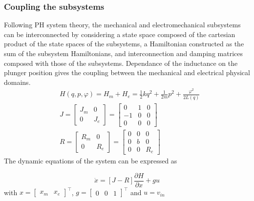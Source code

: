 \documentclass[letterpaper, 10pt, conference]{ieeeconf}
\begin{document}
\subsubsection{Coupling the subsystems}
Following PH system theory, the mechanical and electromechanical subsystems can be interconnected by considering a state space composed of the cartesian product of the state spaces of the subsystems, a Hamiltonian constructed as the sum of the subsystem Hamiltonians, and interconnection and damping matrices composed with those of the subsystems. Dependance of the inductance on the plunger position gives the coupling between the mechanical and electrical physical domains.
\begin{align}
    &H(q,p,\varphi) = H_m + H_e = \frac{1}{2}kq^2 + \frac{1}{2m} p^2 + \frac{\varphi^2}{2 L(q)}\\
    &J = \begin{bmatrix}
        J_m & 0 \\ 0 & J_e
    \end{bmatrix}  = \begin{bmatrix}
        0 & 1 & 0 \\ 
        -1 & 0 & 0 \\
        0 & 0 & 0
    \end{bmatrix}\\
    &R = \begin{bmatrix}
        R_m & 0 \\ 0 & R_e
    \end{bmatrix} = \begin{bmatrix}
        0 & 0 & 0 \\
        0 & b & 0\\
        0 & 0 & R_c
    \end{bmatrix}\label{valveJR}
\end{align}
The dynamic equations of the system can be expressed as

\begin{equation}
    \dot{x} = [J-R]\frac{\partial H}{\partial x} + gu \label{eq:plunger_original_PCH}
\end{equation}
with $x = \begin{bmatrix}
    x_m & x_e
\end{bmatrix}^\top$, $g=\begin{bmatrix}
    0 & 0 & 1
\end{bmatrix}^\top$ and $u=v_{in}$
\end{document}
